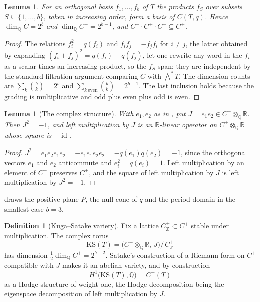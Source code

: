 \documentclass[11pt,reqno]{amsart}
\theoremstyle{plain}
\newtheorem{lemma}[theorem]{Lemma}
\theoremstyle{definition}
\newtheorem{definition}[theorem]{Definition}
\theoremstyle{remark}
\newcommand{\QQ}{\mathbb{Q}}
\newcommand{\ZZ}{\mathbb{Z}}
\newcommand{\RR}{\mathbb{R}}
\DeclareMathOperator{\id}{id}
\begin{document}
\begin{lemma}\label{lem:cliffdim}
For an orthogonal basis $f_{1},\dots,f_{b}$ of $T$ the products $f_{S}$ over
subsets $S\subseteq\{1,\dots,b\}$, taken in increasing order, form a basis of
$C(T,q)$. Hence $\dim_{\QQ}C=2^{b}$ and $\dim_{\QQ}C^{\pm}=2^{b-1}$, and
$C^{-}\cdot C^{+}\cdot C^{-}\subseteq C^{+}$.
\end{lemma}

\begin{proof}
The relations $f_{i}^{2}=q(f_{i})$ and $f_{i}f_{j}=-f_{j}f_{i}$ for $i\ne j$,
the latter obtained by expanding $(f_{i}+f_{j})^{2}=q(f_{i})+q(f_{j})$, let one
rewrite any word in the $f_{i}$ as a scalar times an increasing product, so the
$f_{S}$ span; they are independent by the standard filtration argument
comparing $C$ with $\bigwedge^{*}T$. The dimension counts are
$\sum_{k}\binom{b}{k}=2^{b}$ and
$\sum_{k\ \mathrm{even}}\binom{b}{k}=2^{b-1}$. The last inclusion holds
because the grading is multiplicative and odd plus even plus odd is even.
\end{proof}

\begin{lemma}[The complex structure]\label{lem:cliffJ}
With $e_{1},e_{2}$ as in , put $J=e_{1}e_{2}\in C^{+}\otimes_{\QQ}\RR$.
Then $J^{2}=-1$, and left multiplication by $J$ is an $\RR$-linear operator on
$C^{+}\otimes_{\QQ}\RR$ whose square is $-\id$.
\end{lemma}

\begin{proof}
$J^{2}=e_{1}e_{2}e_{1}e_{2}=-e_{1}e_{1}e_{2}e_{2}=-q(e_{1})q(e_{2})=-1$,
since the orthogonal vectors $e_{1}$ and $e_{2}$ anticommute and
$e_{i}^{2}=q(e_{i})=1$.
Left multiplication by an element of $C^{+}$ preserves $C^{+}$, and the square
of left multiplication by $J$ is left multiplication by $J^{2}=-1$.
\end{proof}

 draws the positive plane $P$, the null cone of $q$ and the
period domain in the smallest case $b=3$.

\begin{definition}[Kuga--Satake variety]\label{def:ksvariety}
Fix a lattice $C^{+}_{\ZZ}\subset C^{+}$ stable under multiplication. The
complex torus
\[
  \mathrm{KS}(T)=\bigl(C^{+}\otimes_{\QQ}\RR,\,J\bigr)\big/\,C^{+}_{\ZZ}
\]
has dimension $\tfrac12\dim_{\QQ}C^{+}=2^{b-2}$. Satake's construction of a
Riemann form on $C^{+}$ compatible with $J$ \cite{Sat66} makes it an abelian
variety, and by construction
\[
  H^{1}\bigl(\mathrm{KS}(T),\QQ\bigr)=C^{+}(T)
\]
as a Hodge structure of weight one, the Hodge decomposition being the
eigenspace decomposition of left multiplication by $J$.
\end{definition}
\end{document}
